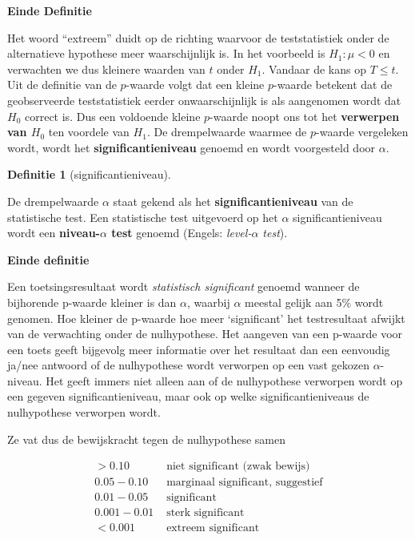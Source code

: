 \documentclass[
  12pt,dutch]{book}
\theoremstyle{definition}
\newtheorem{definition}{Definitie}[chapter]
\theoremstyle{definition}
\theoremstyle{definition}
\theoremstyle{definition}
\theoremstyle{remark}
\begin{document}
\textbf{Einde Definitie}

Het woord ``extreem'' duidt op de richting waarvoor de teststatistiek onder de alternatieve hypothese meer waarschijnlijk is. In het voorbeeld is \(H_1: \mu < 0\) en verwachten we dus kleinere waarden van \(t\) onder \(H_1\). Vandaar de kans op \(T\leq t\).
Uit de definitie van de \(p\)-waarde volgt dat een kleine \(p\)-waarde betekent dat de geobserveerde teststatistiek eerder onwaarschijnlijk is als aangenomen wordt dat \(H_0\) correct is.
Dus een voldoende kleine \(p\)-waarde noopt ons tot het \textbf{verwerpen van \(H_0\)} ten voordele van \(H_1\).
De drempelwaarde waarmee de \(p\)-waarde vergeleken wordt, wordt het \textbf{significantieniveau} genoemd en wordt voorgesteld door \(\alpha\).

\begin{definition}[significantieniveau]
\protect\hypertarget{def:unnamed-chunk-164}{}\label{def:unnamed-chunk-164}~
\end{definition}

De drempelwaarde \(\alpha\) staat gekend als het \textbf{significantieniveau} van de statistische test. Een statistische test uitgevoerd op het \(\alpha\) significantieniveau wordt een \textbf{niveau-\(\alpha\) test} genoemd (Engels: \emph{level-\(\alpha\) test}).

\textbf{Einde definitie}

Een toetsingsresultaat wordt \emph{statistisch significant} genoemd
wanneer de bijhorende p-waarde kleiner is dan \(\alpha\), waarbij \(\alpha\)
meestal gelijk aan 5\% wordt genomen. Hoe kleiner de p-waarde hoe meer
`significant' het testresultaat afwijkt van de verwachting onder de
nulhypothese. Het aangeven van een p-waarde voor een toets geeft bijgevolg
meer informatie over het resultaat dan een eenvoudig ja/nee antwoord of de
nulhypothese wordt verworpen op een vast gekozen \(\alpha\)-niveau. Het geeft immers niet alleen aan of de nulhypothese verworpen wordt op een gegeven significantieniveau, maar ook op welke significantieniveaus de nulhypothese verworpen wordt.

Ze vat dus de bewijskracht tegen de nulhypothese samen

\[\begin{array}{cl}>0.10 & \text{ niet significant (zwak bewijs)}\\0.05-0.10 & \text{ marginaal significant, suggestief}\\0.01-0.05 & \text{ significant}\\0.001-0.01 & \text{ sterk significant}\\<0.001 & \text{ extreem significant}\end{array}\]
\end{document}
